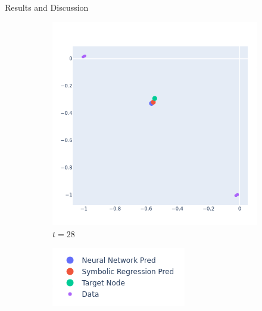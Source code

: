 \documentclass[12pt]{amsbook}
\begin{document}
\begin{chapter}{Results and Discussion}
\begin{figure}
\begin{subfigure}[p]{0.35\textwidth}
                    \includegraphics[width=\linewidth]{./Plots/Test Only/2communities/2communities 3 small net.png}
                    \vspace{-1.5cm}
                    \caption{$t=28$}
                    \label{2community series 3}
                \end{subfigure}
                \begin{subfigure}[p]{0.35\textwidth}
                    \hspace{0.3cm}
                    \vspace{3.5cm}
                    \includegraphics[width=0.7\linewidth]{./Plots/key.png}

                \end{subfigure}


\end{figure}
\end{chapter}
\end{document}
